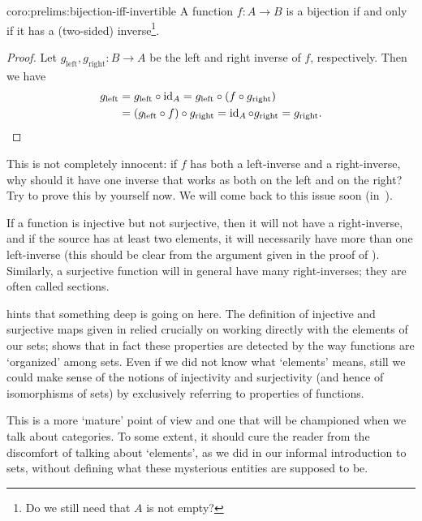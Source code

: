 \begin{coro}{}{coro:prelims:bijection-iff-invertible}
  A function $f : A \to B$ is a bijection if and only if it has a
  (two-sided) inverse\footnote{Do we still need that $A$ is not
    empty?}.
\end{coro}
\begin{proof}
  Let $g_{\mathrm{left}}, g_{\mathrm{right}}:B\to A$ be the left and
  right inverse of $f$, respectively.  Then we have
  \begin{align*}
    g_{\mathrm{left}} &= g_{\mathrm{left}} \circ \operatorname{id}_A
                        = g_{\mathrm{left}} \circ (f \circ g_{\mathrm{right}})\\
                      &= (g_{\mathrm{left}} \circ f) \circ g_{\mathrm{right}} = \operatorname{id}_A \circ g_{\mathrm{right}} = g_{\mathrm{right}}.\qedhere
  \end{align*}
\end{proof}

This is not completely innocent: if $f$ has both a left-inverse and a
right-inverse, why should it have one inverse that works as both on
the left and on the right?  Try to prove this by yourself now. We will
come back to this issue soon (in~).

If a function is injective but not surjective, then it will not have a
right-inverse, and if the source has at least two elements, it will
necessarily have more than one left-inverse (this should be clear from
the argument given in the proof of
). Similarly, a surjective function will in
general have many right-inverses; they are often called sections.

 hints that something deep is going on
here. The definition of injective and surjective maps given in
 relied
crucially on working directly with the elements of our sets;
 shows that in fact these properties are
detected by the way functions are `organized' among sets. Even if we
did not know what `elements' means, still we could make sense of the
notions of injectivity and surjectivity (and hence of isomorphisms of
sets) by exclusively referring to properties of functions.

This is a more `mature' point of view and one that will be championed
when we talk about categories. To some extent, it should cure the
reader from the discomfort of talking about `elements', as we did in
our informal introduction to sets, without defining what these
mysterious entities are supposed to be.

